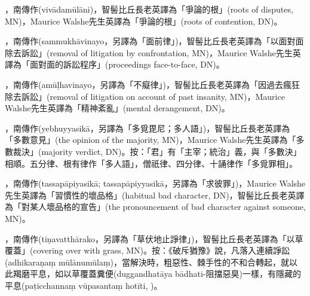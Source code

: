 \startitemgroup[noteitems]
\item{}，南傳作(vivādamūlāni)，智髻比丘長老英譯為「爭論的根」(roots of disputes, MN)，Maurice Walshe先生英譯為「爭論的根」(roots of contention, DN)。
\stopitemgroup

\startitemgroup[noteitems]
\item{}，南傳作(sammukhāvinayo，另譯為「面前律」)，智髻比丘長老英譯為「以面對面除去訴訟」(removal of litigation by confrontation, MN)，Maurice Walshe先生英譯為「面對面的訴訟程序」(proceedings face-to-face, DN)。
\stopitemgroup

\startitemgroup[noteitems]
\item{}，南傳作(amūḷhavinayo，另譯為「不癡律」)，智髻比丘長老英譯為「因過去瘋狂除去訴訟」(removal of litigation on account of past insanity, MN)，Maurice Walshe先生英譯為「精神紊亂」(mental derangement, DN)。
\stopitemgroup

\startitemgroup[noteitems]
\item{}，南傳作(yebhuyyasikā，另譯為「多覓毘尼；多人語」)，智髻比丘長老英譯為「多數意見」(the opinion of the majority, MN)，Maurice Walshe先生英譯為「多數裁決」(majority verdict, DN)。按：「君」有「主宰；統治」義，與「多數決」相順。五分律、根有律作「多人語」，僧祇律、四分律、十誦律作「多覓罪相」。
\stopitemgroup

\startitemgroup[noteitems]
\item{}，南傳作(tassapāpiyasikā; tassapāpiyyasikā，另譯為「求彼罪」)，Maurice Walshe先生英譯為「習慣性的壞品格」(habitual bad character, DN)，智髻比丘長老英譯為「對某人壞品格的宣告」(the pronouncement of bad character against someone, MN)。
\stopitemgroup

\startitemgroup[noteitems]
\item{}，南傳作(tiṇavatthārako，另譯為「草伏地止諍律」)，智髻比丘長老英譯為「以草覆蓋」(covering over with grass, MN)。按：《破斥猶豫》說，凡落入連續諍訟(adhikaraṇaṃ mūlānumūlaṃ)，當解決時，粗惡性、棘手性的不和合轉起，就以此羯磨平息，如以草覆蓋糞便(duggandhatāya bādhati-阻擋惡臭)一樣，有隱藏的平息(paṭicchannaṃ vūpasantaṃ hotīti, )。
\stopitemgroup

